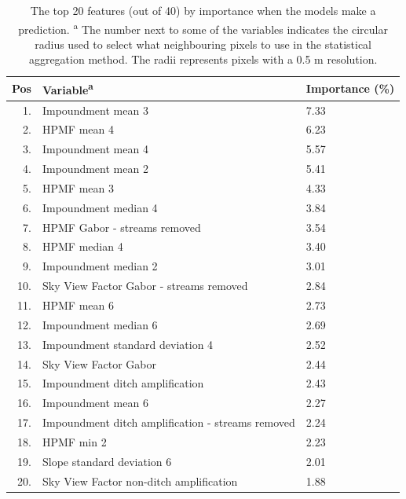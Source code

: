 \documentclass[11pt, review]{elsarticle} %
\begin{document}
\begin{table} [!htb]
        {\begin{tabular}{r|ll}
          Pos & Variable\textsuperscript{a} & Importance (\%) \\
          \hline
          1.  & Impoundment mean 3                                  & 7.33\\
          2.  & HPMF mean 4                                         & 6.23\\
          3.  & Impoundment mean 4                                  & 5.57\\
          4.  & Impoundment mean 2                                  & 5.41\\
          5.  & HPMF mean 3                                         & 4.33\\
          6.  & Impoundment median 4                                & 3.84\\
          7.  & HPMF Gabor - streams removed                        & 3.54\\
          8.  & HPMF median 4                                       & 3.40\\
          9.  & Impoundment median 2                                & 3.01\\
          10. & Sky View Factor Gabor - streams removed             & 2.84\\
          11. & HPMF mean 6                                         & 2.73\\
          12. & Impoundment median 6                                & 2.69\\
          13. & Impoundment standard deviation 4                    & 2.52\\
          14. & Sky View Factor Gabor                               & 2.44\\
          15. & Impoundment ditch amplification                     & 2.43\\
          16. & Impoundment mean 6                                  & 2.27\\
          17. & Impoundment ditch amplification - streams removed   & 2.24\\
          18. & HPMF min 2                                          & 2.23\\
          19. & Slope standard deviation 6                          & 2.01\\
          20. & Sky View Factor non-ditch amplification             & 1.88\\
          \hline
        \end{tabular}}
        \caption{The top 20 features (out of 40) by importance when the models make a prediction. \newline \textsuperscript{a} The number next to some of the variables indicates the circular radius used to select what neighbouring pixels to use in the statistical aggregation method. The radii represents pixels with a 0.5 m resolution.}
    \label{featureimportancetable}
\end{table}
\clearpage
\end{document}
